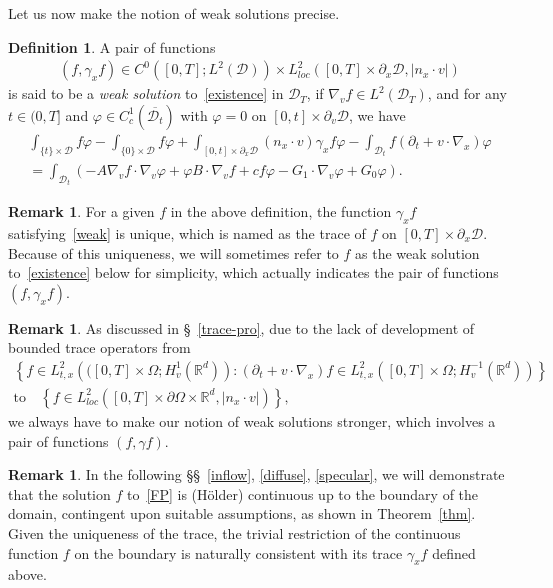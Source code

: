 \documentclass[10pt]{amsart}
\theoremstyle{definition}\newtheorem{defi}[theo]{Definition}\newtheorem{rema}[theo]{Remark}\newtheorem{exam}[theo]{Example}\newtheorem{exem}[theo]{Example}\newtheorem{nota}[theo]{Notation}
\newcommand*\p{\partial}
\newcommand*\R {\mathbb{R}}
\newcommand*\D {\mathcal{D}}
\begin{document}
Let us now make the notion of weak solutions precise.

\begin{defi}\label{def-weak}
A pair of functions
\begin{align*}
(f,\gamma_xf)\in C^0\left([0,T];L^2(\D)\right)\times L_{loc}^2\left([0,T]\times\p_x\D,|n_x\cdot v|\right)
\end{align*}
is said to be a \emph{weak solution} to~\eqref{existence} in $\D_T$, if $\nabla_vf\in L^2(\D_T)$, and for any $t\in(0,T]$ and $\varphi\in C^1_c(\overline{\D_t})$ with $\varphi=0$ on $[0,t]\times\p_v\D$, we have
\begin{multline}\label{weak}
\int_{\{t\}\times\D} f\varphi -\int_{\{0\}\times\D}f\varphi + \int_{[0,t]\times\p_x\D} (n_x\cdot v)\gamma_xf\varphi -\int_{\D_t} f\left(\p_t+v\cdot\nabla_x\right)\varphi \\
=\int_{\D_t} \left(-A\nabla_vf\cdot\nabla_v\varphi + \varphi B\cdot\nabla_vf + c f\varphi -G_1\cdot\nabla_v\varphi +G_0\varphi\right).
\end{multline}
\end{defi}

\begin{rema}
For a given $f$ in the above definition, the function $\gamma_xf$ satisfying~\eqref{weak} is unique, which is named as the trace of $f$ on $[0,T]\times\p_x\D$. Because of this uniqueness, we will sometimes refer to $f$ as the weak solution to~\eqref{existence} below for simplicity, which actually indicates the pair of functions $(f,\gamma_xf)$.
\end{rema}

\begin{rema}
As discussed in \S~\ref{trace-pro}, due to the lack of development of bounded trace operators from
\begin{multline*}
\left\{f\in L_{t,x}^2\left(([0,T]\times\Omega;H_v^1\left(\R^d\right)\right):(\p_t+v\cdot\nabla_x)f\in L_{t,x}^2\left([0,T]\times\Omega;H_v^{-1}\left(\R^d\right)\right)\right\}\\
\text{to}\quad\left\{f\in L_{loc}^2\left([0,T]\times\p\Omega\times\R^d,|n_x\cdot v|\right)\right\},
\end{multline*}
we always have to make our notion of weak solutions stronger, which involves a pair of functions $(f,\gamma f)$.
\end{rema}

\begin{rema}
In the following \S\S~\ref{inflow}, \ref{diffuse}, \ref{specular}, we will demonstrate that the solution $f$ to~\eqref{FP} is (H\"older) continuous up to the boundary of the domain, contingent upon suitable assumptions, as shown in Theorem~\ref{thm}. Given the uniqueness of the trace, the trivial restriction of the continuous function $f$ on the boundary is naturally consistent with its trace $\gamma_x f$ defined above.
\end{rema}
\end{document}
